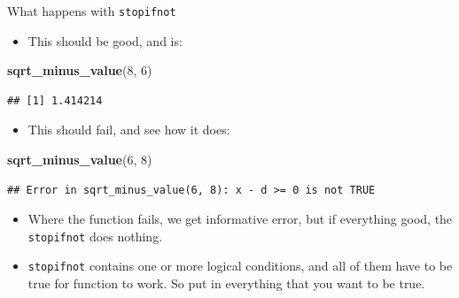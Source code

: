 \documentclass[
  ignorenonframetext,
]{beamer}
\newenvironment{Shaded}{\begin{snugshade}}{\end{snugshade}}
\newcommand{\DecValTok}[1]{\textcolor[rgb]{0.00,0.00,0.81}{#1}}
\newcommand{\KeywordTok}[1]{\textcolor[rgb]{0.13,0.29,0.53}{\textbf{#1}}}
\newcommand{\NormalTok}[1]{#1}
\providecommand{\tightlist}{%
  \setlength{\itemsep}{0pt}\setlength{\parskip}{0pt}}
\begin{document}
\begin{frame}[fragile]{What happens with \texttt{stopifnot}}
\protect\hypertarget{what-happens-with-stopifnot}{}

\begin{itemize}
\tightlist
\item
  This should be good, and is:
\end{itemize}

\begin{Shaded}
\begin{Highlighting}[]
\KeywordTok{sqrt_minus_value}\NormalTok{(}\DecValTok{8}\NormalTok{, }\DecValTok{6}\NormalTok{)}
\end{Highlighting}
\end{Shaded}

\begin{verbatim}
## [1] 1.414214
\end{verbatim}

\begin{itemize}
\tightlist
\item
  This should fail, and see how it does:
\end{itemize}

\begin{Shaded}
\begin{Highlighting}[]
\KeywordTok{sqrt_minus_value}\NormalTok{(}\DecValTok{6}\NormalTok{, }\DecValTok{8}\NormalTok{)}
\end{Highlighting}
\end{Shaded}

\begin{verbatim}
## Error in sqrt_minus_value(6, 8): x - d >= 0 is not TRUE
\end{verbatim}

\begin{itemize}
\tightlist
\item
  Where the function fails, we get informative error, but if everything
  good, the \texttt{stopifnot} does nothing.
\item
  \texttt{stopifnot} contains one or more logical conditions, and all of
  them have to be true for function to work. So put in everything that
  you want to be true.
\end{itemize}

\end{frame}
\end{document}
